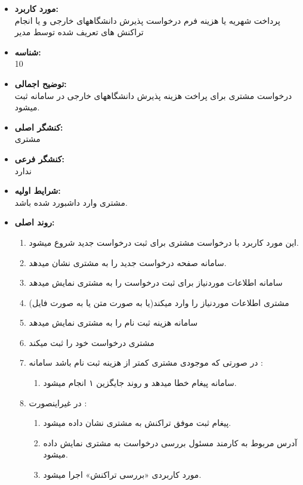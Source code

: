 \documentclass{article}
\begin{document}
\begin{itemize}
\item \textbf{مورد کاربرد:}\\
پرداخت شهریه یا هزینه فرم درخواست پذیرش دانشگاههای خارجی و یا انجام تراکنش های تعریف شده توسط مدیر
\item \textbf{شناسه:}\\
10
\item \textbf{توضیح اجمالی:}\\
درخواست مشتری برای پراخت هزینه پذیرش دانشگاههای خارجی در سامانه ثبت میشود.
\item \textbf{کنشگر اصلی:}\\
مشتری
\item \textbf{کنشگر فرعی:}\\
ندارد
\item \textbf{شرایط اولیه:}\\
مشتری وارد داشبورد شده باشد.
\item \textbf{روند اصلی:}\\
\begin{enumerate}
\item  این مورد کاربرد با درخواست مشتری برای ثبت درخواست جدید شروع میشود.
\item سامانه صفحه درخواست جدید را به مشتری نشان میدهد.
\item سامانه اطلاعات موردنیاز برای ثبت درخواست را به مشتری نمایش میدهد
\item مشتری اطلاعات موردنیاز را وارد میکند(یا به صورت متن یا به صورت فایل)
\item سامانه هزینه ثبت نام را به مشتری نمایش میدهد
\item مشتری درخواست خود را ثبت میکند
\item در صورتی که موجودی مشتری کمتر از هزینه ثبت نام باشد سامانه :
\begin{enumerate}
\item سامانه پیغام خطا میدهد و روند جایگزین ۱ انجام میشود. 
\end{enumerate}

\item در غیراینصورت	:
\begin{enumerate}
\item پیغام ثبت موفق تراکنش به مشتری نشان داده میشود.
\item آدرس مربوط به کارمند مسئول بررسی درخواست به مشتری نمایش داده میشود.
\item مورد کاربردی «بررسی تراکنش» اجرا میشود.
\end{enumerate}

\end{enumerate}


\end{itemize}
\end{document}
